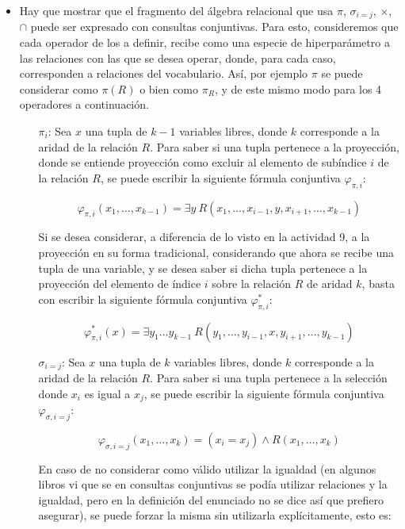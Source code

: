 \documentclass[letterpaper,10pt]{article}
\begin{document}
\begin{itemize}
    \item Hay que mostrar que el fragmento del álgebra relacional que usa $\pi$, $\sigma_{i=j}$, $\times$, $\cap$ puede ser expresado con consultas conjuntivas. Para esto, consideremos que cada operador de los a definir, recibe como una especie de hiperparámetro a las relaciones con las que se desea operar, donde, para cada caso, corresponden a relaciones del vocabulario. Así, por ejemplo $\pi$ se puede considerar como $\pi(R)$ o bien como $\pi_R$, y de este mismo modo para los 4 operadores a continuación.

    \begin{itemize}
        \item [$\pi_i$:] Sea $x$ una tupla de $k-1$ variables libres, donde $k$ corresponde a la aridad de la relación $R$. Para saber si una tupla pertenece a la proyección, donde se entiende proyección como excluir al elemento de subíndice $i$ de la relación $R$, se puede escribir la siguiente fórmula conjuntiva $\varphi_{\pi,i}$:

        $$\varphi_{\pi,i}(x_1, \dots, x_{k-1}) = \exists y \ R(x_1, \dots, x_{i-1}, y, x_{i+1}, \dots, x_{k-1})$$

        Si se desea considerar, a diferencia de lo visto en la actividad 9, a la proyección en su forma tradicional, considerando que ahora se recibe una tupla de una variable, y se desea saber si dicha tupla pertenece a la proyección del elemento de índice $i$ sobre la relación $R$ de aridad $k$, basta con escribir la siguiente fórmula conjuntiva $\varphi_{\pi,i}^*$:

        $$\varphi_{\pi,i}^*(x) = \exists y_1 \dots y_{k-1} \ R(y_1, \dots, y_{i-1}, x, y_{i+1}, \dots, y_{k-1})$$

        \item [$\sigma_{i=j}$:] Sea $x$ una tupla de $k$ variables libres, donde $k$ corresponde a la aridad de la relación $R$. Para saber si una tupla pertenece a la selección donde $x_i$ es igual a $x_j$, se puede escribir la siguiente fórmula conjuntiva $\varphi_{\sigma,i=j}$:

        $$\varphi_{\sigma,i=j}(x_1, \dots, x_k) = (x_i = x_j) \wedge R(x_1, \dots, x_k)$$

        En caso de no considerar como válido utilizar la igualdad (en algunos libros vi que se en consultas conjuntivas se podía utilizar relaciones y la igualdad, pero en la definición del enunciado no se dice así que prefiero asegurar), se puede forzar la misma sin utilizarla explícitamente, esto es:


\end{itemize}
\end{itemize}
\end{document}
